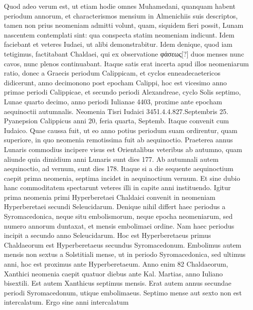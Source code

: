 Quod adeo verum est, ut etiam hodie omnes Muhamedani, quanquam
habent periodum annorum, et characterismos mensium in Almenichiis
suis descriptos, tamen non prius neomeniam admitti volunt,
quam, siquidem fieri possit, Lunam nascentem contemplati sint: qua
conspecta statim neomeniam indicunt.
Idem faciebant et veteres Iudaei,
ut alibi demonstrabitur.
Idem denique, quod iam tetigimus, factitabant
Chaldaei, qui ex observatione \textgreek{φάσεως[?]} duos menses nunc cavos,
nunc plenos continuabant.
Itaque satis erat incerta apud illos neomeniarum
ratio, donec a Graecis periodum Calippicam, et cyclos
enneadecaetericos didicerunt, anno decimonono post epocham Calippi,
hoc est vicesimo anno primae periodi Calippicae, et secundo periodi
Alexandreae, cyclo Solis septimo, Lunae quarto decimo, anno periodi
Iulianae 4403, proxime ante epocham aequinoctii autumnalis.
Neomenia
Tisri Iudaici 3451.4.4.827.Septembris 25.
Pyanepsion Calippicus
anni 20, feria quarta,  Septemb. %
Itaque convenit cum Iudaico.
Quae caussa fuit, ut eo anno potius periodum suam ordirentur,
quam superiore, in quo neomenia remotissima fuit ab aequinoctio.
Praeterea annus Lunaris commodius incipere visus est Orientalibus
veteribus ab autumno, quam aliunde quia dimidium anni Lunaris
sunt dies 177.
Ab autumnali autem aequinoctio, ad vernum, sunt dies
178.
Itaque si a die sequente aequinoctium caepit prima neomenia, septima
incidet in aequinoctium vernum.
Et sine dubio hanc commoditatem
spectarunt veteres illi in capite anni instituendo.
Igitur prima
neomenia primi Hyperberetaei Chaldaici convenit in neomeniam
Hyperberetaei secundi Seleucidarum.
Denique nihil differt haec periodus
a Syromacedonica, neque situ embolismorum, neque epocha
neomeniarum, sed numero annorum duntaxat, et mensis embolimaei
ordine.
Nam haec periodus incipit a secundo anno Seleucidarum.
Hoc est Hyperberetaeus primus Chaldaeorum est Hyperberetaeus secundus
Syromacedonum.
Embolimus autem mensis non sextus a
Solstitiali mense, ut in periodo Syromacedonica, sed ultimus anni, hoc
est proximus ante Hyperberetaeum.
Anno enim 82 Chaldaeorum,
Xanthici neomenia caepit quatuor diebus ante Kal. %
 Martias, anno
Iuliano bisextili.
Est autem Xanthicus septimus mensis.
Erat autem
annus  secundae periodi Syromacedonum, utique embolimaeus.
Septimo mense aut sexto non est intercalatum.
Ergo sine anni intercalatum
